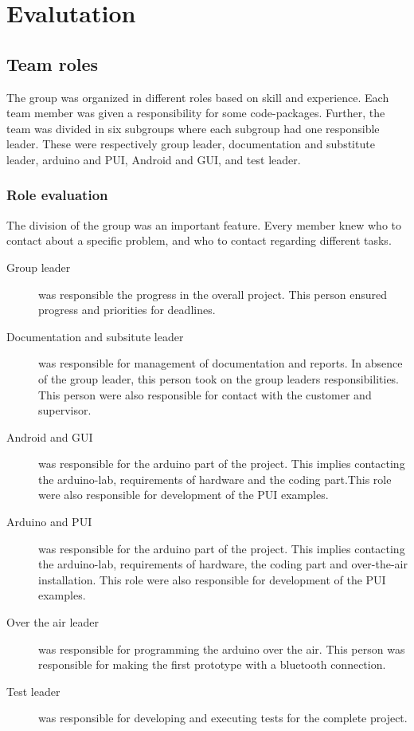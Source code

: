 \section{Evalutation}
\subsection{Team roles}
The group was organized in different roles based on skill and experience. Each team member was given a responsibility for some code-packages. Further, the team was divided in six subgroups where each subgroup had one responsible leader. These were respectively group leader, documentation and substitute leader, arduino and PUI, Android and GUI, and test leader.

\subsubsection{Role evaluation}
The division of the group was an important feature. Every member knew who to contact about a specific problem, and who to contact regarding different tasks.
\begin{description}
	\item[Group leader]{was responsible the progress in the overall project. This person ensured progress and priorities for deadlines.}
	\item[Documentation and subsitute leader]{was responsible for management of documentation and reports. In absence of the group leader, this person took on the group leaders responsibilities. This person were also responsible for contact with the customer and supervisor. }
	\item[Android and GUI]{was responsible for the arduino part of the project. This implies contacting the arduino-lab, requirements of hardware and the coding part.This role were also responsible for development of the PUI examples.}
	\item[Arduino and PUI]{was responsible for the arduino part of the project. This implies contacting the arduino-lab, requirements of hardware, the coding part and over-the-air installation. This role were also responsible for development of the PUI examples.}
	\item[Over the air leader]{was responsible for programming the arduino over the air. This person was responsible for making the first prototype with a bluetooth connection.}
	\item[Test leader]{was responsible for developing and executing tests for the complete project.}
\end{description}
